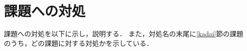 \documentclass[tanilab-enum]{graduate}
\begin{document}
\section{課題への対処}\label{taisyo}
課題への対処を以下に示し，説明する．
また，対処名の末尾に\ref{kadai}節の課題のうち，どの課題に対する対処かを示している．

\end{document}

